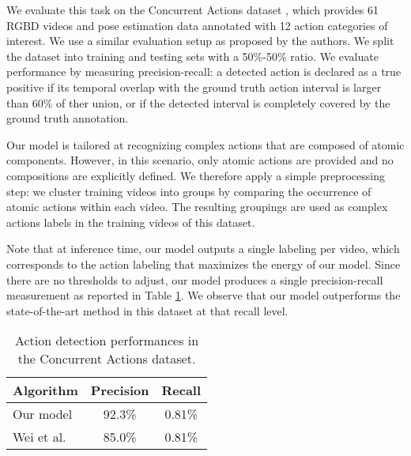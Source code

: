 We evaluate this task on the Concurrent Actions dataset \cite{Wei2013},
which
provides 61 RGBD videos and pose estimation data annotated with 12
action categories of interest.
We use a similar evaluation setup as proposed by the authors.
We split the dataset into training and testing sets with a 50\%-50\% ratio.
We evaluate performance by measuring precision-recall: a detected action
is declared as a true positive if its temporal overlap with the ground
truth action interval is larger than 60\% of ther union, or if
the detected interval is completely covered by the ground truth annotation.

Our model is tailored at recognizing complex actions that are composed
of atomic components. However, in this scenario, only atomic actions are
provided and no compositions are explicitly defined. We therefore apply
a simple preprocessing step: we cluster training videos into groups
by comparing the occurrence of atomic actions within each video.
The resulting groupings are used as complex actions labels in the training
videos of this dataset.

Note that at inference time, our model outputs a single labeling per video,
which corresponds to the action labeling that maximizes the energy of our
model. Since there are no thresholds to adjust, our model produces a single
precision-recall measurement as reported in Table \ref{tab:concurrent}.
We observe that our model outperforms the state-of-the-art method in this
dataset at that recall level.





\begin{table}
\centering
\begin{tabular}{|l|c|c|}
\hline
\textbf{Algorithm} & \textbf{Precision} & \textbf{Recall}\\
\hline
Our model &  92.3\% & 0.81\% \\
\hline
Wei et al. \cite{Wei2013} & 85.0\% & 0.81\% \\
\hline
\end{tabular}
\caption{Action detection performances in the Concurrent Actions dataset. }
\label{tab:concurrent}
\end{table}
 
